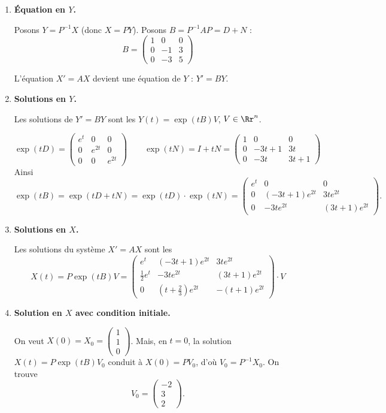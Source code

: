 \documentclass[12pt, class=report,crop=false]{standalone}
\begin{document}
\begin{exemple}
\begin{enumerate}
  \item \textbf{\'Equation en $Y$.} 
  
  Posons $Y = P^{-1}X$ (donc $X=PY$). Posons $B = P^{-1}AP=D+N$ :
  $$B = \begin{pmatrix}
  1 & 0 & 0 \\
  0 & -1 & 3 \\
  0 & -3 & 5
  \end{pmatrix}$$
  
  L'équation $X'=AX$ devient une équation de $Y$ :
  $Y' = BY$.
  
  \item \textbf{Solutions en $Y$.}  
  
  Les solutions de $Y' = BY$ sont les $Y(t)=\exp(tB)V$, $V\in\Rr^n$.
  
  $$\exp(tD) = \begin{pmatrix}e^{t}&0&0\\0&e^{2t}&0\\0&0&e^{2t}\end{pmatrix}
  \qquad
  \exp(tN) = I + tN 
  = 
  \begin{pmatrix}
  1 & 0 & 0 \\
  0 & -3t + 1 & 3t \\
  0 & -3t & 3t + 1
  \end{pmatrix}
  $$
  Ainsi
  $$\exp(tB)=\exp(tD+tN)=\exp(tD)\cdot\exp(tN)=
  \begin{pmatrix}
  e^{t} & 0 & 0 \\
  0 & (-3t + 1)e^{2t} & 3te^{2t} \\
  0 & -3te^{2t} & (3t + 1)e^{2t}
  \end{pmatrix}.
  $$
   
  \item \textbf{Solutions en $X$.}
   
  Les solutions du système $X'=AX$ sont les
  $$X(t) = P\exp(tB)V = 
  \begin{pmatrix}
  e^t & (-3t + 1)e^{2t} & 3te^{2t} \\
  \frac12 e^t & -3te^{2t} & (3t + 1)e^{2t} \\
  0 & (t+\frac23)e^{2t} & -(t + 1)e^{2t}
  \end{pmatrix} \cdot V$$
   
  \item \textbf{Solution en $X$ avec condition initiale.} 
  
  On veut $X(0) = X_0= \left(\begin{smallmatrix}1\\1\\0\end{smallmatrix}\right)$.
  Mais, en $t=0$, la solution $X(t) = P\exp(tB)V_0$ conduit à 
  $X(0) = PV_0$, d'où $V_0 = P^{-1}X_0$.
  On trouve 
  $$V_0 = \begin{pmatrix}-2\\3\\2\end{pmatrix}.$$  
  

\end{enumerate}
\end{exemple}
\end{document}
